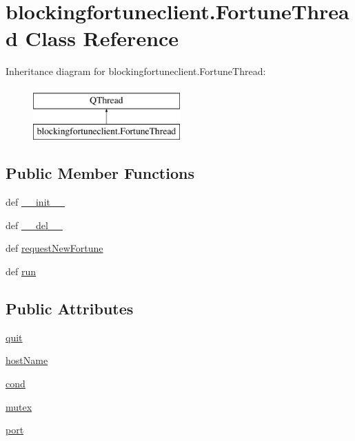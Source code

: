 \hypertarget{classblockingfortuneclient_1_1FortuneThread}{}\section{blockingfortuneclient.\+Fortune\+Thread Class Reference}
\label{classblockingfortuneclient_1_1FortuneThread}
Inheritance diagram for blockingfortuneclient.\+Fortune\+Thread\+:\begin{figure}[H]
\begin{center}
\leavevmode
\includegraphics[height=2.000000cm]{classblockingfortuneclient_1_1FortuneThread}
\end{center}
\end{figure}
\subsection*{Public Member Functions}
\begin{DoxyCompactItemize}
\item 
def \hyperlink{classblockingfortuneclient_1_1FortuneThread_a7a60c2fe9cf6597c602ca5bf91aab7f5}{\+\_\+\+\_\+init\+\_\+\+\_\+}
\item 
def \hyperlink{classblockingfortuneclient_1_1FortuneThread_afa019a9a5233e982a2b68f16944393a4}{\+\_\+\+\_\+del\+\_\+\+\_\+}
\item 
def \hyperlink{classblockingfortuneclient_1_1FortuneThread_aebd1bbc49faffc816c71d3de04253273}{request\+New\+Fortune}
\item 
def \hyperlink{classblockingfortuneclient_1_1FortuneThread_ad3c75463baa790d07beffc994286476d}{run}
\end{DoxyCompactItemize}
\subsection*{Public Attributes}
\begin{DoxyCompactItemize}
\item 
\hyperlink{classblockingfortuneclient_1_1FortuneThread_ab4d37bb3939a952811e52f50db1a443e}{quit}
\item 
\hyperlink{classblockingfortuneclient_1_1FortuneThread_aeff56f77f924eba9498d4f7640931a05}{host\+Name}
\item 
\hyperlink{classblockingfortuneclient_1_1FortuneThread_a6b7f786d3a7bc154b826a81d0cd65228}{cond}
\item 
\hyperlink{classblockingfortuneclient_1_1FortuneThread_a5f9f4aa31943723d2835196c4aadf71d}{mutex}
\item 
\hyperlink{classblockingfortuneclient_1_1FortuneThread_a7200c0ee4d24fbc8496f32ed701e1a29}{port}
\end{DoxyCompactItemize}
